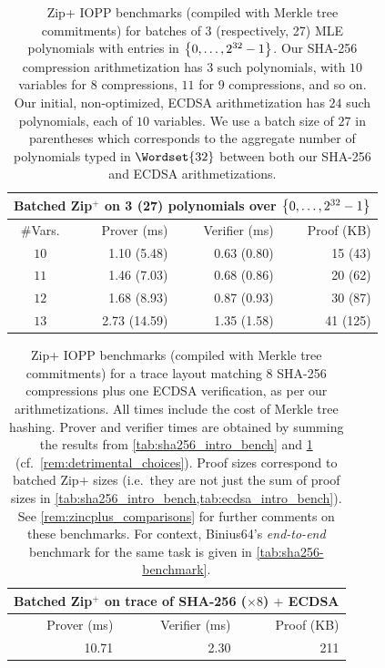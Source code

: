\begin{table}[H]
\centering
\begin{tabular}{crrr}
\toprule
\multicolumn{4}{c}{\textbf{Batched Zip${}^+$ on 3 (27) polynomials over $\range{0}{2^{32}-1}$}} \\
\midrule
\#Vars. & Prover (ms) & Verifier (ms) & Proof (KB) \\
\midrule
$10$ & 1.10 (5.48) & 0.63 (0.80) & 15 (43)  \\
$11$ & 1.46 (7.03) & 0.68 (0.86) & 20 (62)  \\
$12$ & 1.68 (8.93) & 0.87 (0.93) & 30 (87)  \\
$13$ & 2.73 (14.59) & 1.35 (1.58) & 41 (125) \\
\bottomrule
\end{tabular}
\caption{ Zip+ IOPP benchmarks (compiled with Merkle tree commitments) for batches of 3 (respectively, 27) MLE polynomials with entries in $\range{0}{2^{32}-1}$.  Our SHA-256 compression arithmetization has 3 such polynomials, with $10$ variables for $8$ compressions, $11$ for $9$ compressions, and so on. Our initial, non-optimized, ECDSA arithmetization has $24$ such polynomials, each of $10$ variables. We use a batch size of $27$ in parentheses which corresponds to the aggregate number of polynomials typed in $\Wordset{32}$ between both our SHA-256 and ECDSA arithmetizations.}%
\label{tab:ecdsa_intro_bench}
\end{table}


\begin{table}[H]
\centering
\begin{tabular}{rrr}
\toprule
\multicolumn{3}{c}{\textbf{Batched Zip${}^+$ on trace of SHA-256 ($\times 8$) $+$ ECDSA}} \\
\midrule
Prover (ms) & Verifier (ms) & Proof (KB) \\
\midrule
10.71 & 2.30 & 211 \\
\bottomrule
\end{tabular}
\caption{Zip+ IOPP benchmarks (compiled with Merkle tree commitments) for a trace layout  matching $8$ SHA-256 compressions plus one ECDSA verification, as per our arithmetizations. All times include the cost of Merkle tree hashing.
 Prover and verifier times are obtained by summing the  results from \cref{tab:sha256_intro_bench} and \cref{tab:ecdsa_intro_bench} (cf.\ \cref{rem:detrimental_choices}). Proof sizes correspond to batched Zip$+$ sizes (i.e.\ they are not just the sum of proof sizes in \cref{tab:sha256_intro_bench,tab:ecdsa_intro_bench}). See \cref{rem:zincplus_comparisons} for further comments on these benchmarks.
For context, Binius64's \emph{end-to-end} benchmark for the same task is given in \cref{tab:sha256-benchmark}.}
\label{tab:sha256_ecdsa_intro_bench}
\end{table}


